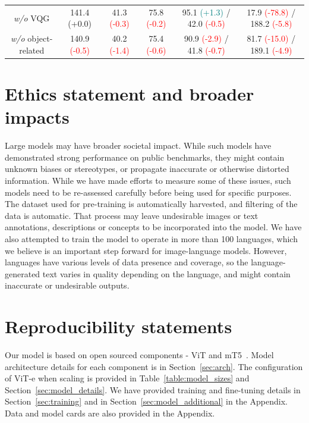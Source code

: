 \documentclass{article}
\begin{document}
\begin{table}[ht]
{\begin{tabular}{cccccc}
 \emph{w/o} VQG & 141.4 {\scriptsize{(+0.0)}} & 41.3 {\scriptsize{\textcolor{red}{(-0.3)}}} & 75.8 {\scriptsize{\textcolor{red}{(-0.2)}}} & 95.1 {\scriptsize{\textcolor{teal}{(+1.3)}}} / 42.0 {\scriptsize{\textcolor{red}{(-0.5)}}} & 17.9 {\scriptsize{\textcolor{red}{(-78.8)}}} / 188.2 {\scriptsize{\textcolor{red}{(-5.8)}}}\\
 \emph{w/o} object-related & 140.9 {\scriptsize{\textcolor{red}{(-0.5)}}} & 40.2 {\scriptsize{\textcolor{red}{(-1.4)}}} & 75.4 {\scriptsize{\textcolor{red}{(-0.6)}}} & 90.9 {\scriptsize{\textcolor{red}{(-2.9)}}} / 41.8 {\scriptsize{\textcolor{red}{(-0.7)}}} & 81.7 {\scriptsize{\textcolor{red}{(-15.0)}}} / 189.1 {\scriptsize{\textcolor{red}{(-4.9)}}} \\
\bottomrule
\end{tabular}}
\label{table:abation_mixture}
\end{table}

\clearpage

\section*{Ethics statement and broader impacts}
Large models may have broader societal impact.
While such models have demonstrated strong performance on public benchmarks, they might contain unknown biases or stereotypes, or propagate inaccurate or otherwise distorted information.
While we have made efforts to measure some of these issues, such models need to be re-assessed carefully before being used for specific purposes. 
The dataset used for pre-training is automatically harvested, and filtering of the data is automatic. 
That process may leave undesirable images or text annotations, descriptions or concepts to be incorporated into the model. 
We have also attempted to train the model to operate in more than 100 languages, which we believe is an important step forward for image-language models.
However, languages have various levels of data presence and coverage, so the language-generated text varies in quality depending on the language, and might contain inaccurate or undesirable outputs.  

\section*{Reproducibility statements}

Our model is based on open sourced components - ViT and mT5~\citep{dosovitskiy-2021-vit,xue-2021-mt5}. Model architecture details for each component is in Section~\ref{sec:arch}. The configuration of ViT-e when scaling is provided in Table~\ref{table:model_sizes} and Section~\ref{sec:model_details}.
We have provided training and fine-tuning details in Section~\ref{sec:training} and in Section~\ref{sec:model_additional} in the Appendix. Data and model cards are also provided in the Appendix.
\end{document}
